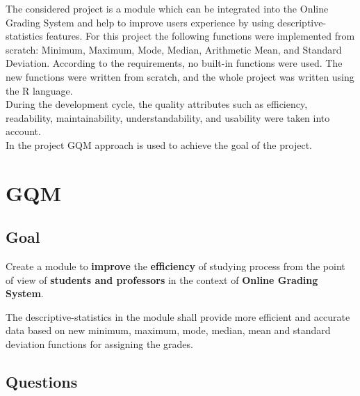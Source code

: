 \documentclass[12pt]{article}
\begin{document}
The considered project is a module which can be integrated into the Online Grading System and help to improve users experience by using descriptive-statistics features. For this project the following functions were implemented from scratch: Minimum, Maximum, Mode, Median, Arithmetic Mean, and Standard Deviation. According to the requirements, no built-in functions were used. The new functions were written from scratch, and the whole project was written using the R language.\\

During the development cycle, the quality attributes such as efficiency, readability,  maintainability, understandability, and usability were taken into account.\\

In the project GQM approach is used to achieve the goal of the project.\cite{GQM-approach}  \cite{GQM-book} \cite{GQM-book2} \cite{GQM-Bjorn}

\section{GQM}      
\subsection{Goal}
Create a module to \textbf{improve} the \textbf{efficiency} of studying process from the point of view of \textbf{students and professors} in the context of \textbf{Online Grading System}. \\ \par 
The descriptive-statistics in the module shall provide more efficient and accurate data based on new minimum, maximum, mode, median, mean and standard deviation functions for assigning the grades.

\subsection{Questions}
\end{document}
